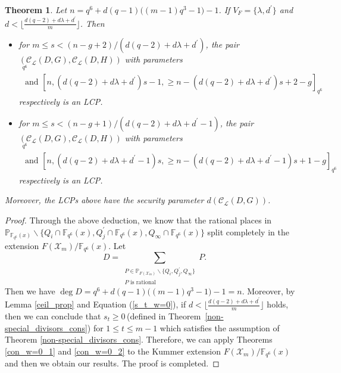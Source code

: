 \documentclass[journal,12pt,onecolumn]{IEEEtran}
\newtheorem{theorem}{Theorem}
\begin{document}
\begin{theorem}
    Let $n = q^6 + d(q-1)\big((m-1)q^3-1\big)-1$. If $V_F = \{\lambda,d^\prime\}$ and $d< \big\lfloor \frac{d(q-2)+d\lambda+d^\prime}{m} \big\rfloor$. Then 
    \begin{itemize}
        \item for $m\le s <(n-g+2)/(d(q-2)+d\lambda+d^\prime)$, the pair $(\mathcal{C}_{\mathcal{L}}(D,G),\mathcal{C}_{\mathcal{L}}(D,H))$ with parameters
        \begin{gather*}
            [n,n-(d(q-2)+d\lambda+d^\prime)s+1,\ge (d(q-2)+d\lambda+d^\prime)s-g]_{q^6}\\
            \text{ and }[n,(d(q-2)+d\lambda+d^\prime)s-1,\ge n-(d(q-2)+d\lambda+d^\prime)s+2-g]_{q^6}
        \end{gather*}
        respectively is an LCP. 
        \item for $m\le s <(n-g+1)/(d(q-2)+d\lambda+d^\prime-1)$, the pair $(\mathcal{C}_{\mathcal{L}}(D,G),\mathcal{C}_{\mathcal{L}}(D,H))$ with parameters
        \begin{gather*}
            [n,n-(d(q-2)+d\lambda+d^\prime-1)s,\ge (d(q-2)+d\lambda+d^\prime-1)s+1-g]_{q^6}\\
            \text{ and }[n,(d(q-2)+d\lambda+d^\prime-1)s,\ge n-(d(q-2)+d\lambda+d^\prime-1)s+1-g]_{q^6}
        \end{gather*}
        respectively is an LCP. 
    \end{itemize}
    Moreover, the LCPs above have the security parameter $d(\mathcal{C}_{\mathcal{L}}(D,G))$. 
\end{theorem}
\begin{proof}
    Through the above deduction, we know that the rational places in $\mathbb{P}_{\mathbb{F}_{q^6}(x)}\backslash\{Q_i\cap\mathbb{F}_{q^6}(x),Q_j^\prime\cap\mathbb{F}_{q^6}(x),Q_\infty\cap\mathbb{F}_{q^6}(x)\}$ split completely in the extension $F(\mathcal{X}_m)/\mathbb{F}_{q^6}(x)$. Let 
    \[
        D = \sum_{\substack{P\in\mathbb{P}_{F(\mathcal{X}_m)}\backslash\{Q_i,Q_j^\prime,Q_\infty\}\\  P \text{ is rational}}}P.
    \]
    Then we have $\deg D = q^6 + d(q-1)\big((m-1)q^3-1\big)-1 = n$. Moreover, by Lemma \ref{ceil_prop} and Equation (\ref{s_t_w=0}), if $d< \big\lfloor \frac{d(q-2)+d\lambda+d^\prime}{m} \big\rfloor$ holds, then we can conclude that $s_t\ge 0$\,(defined in Theorem~\ref{non-special_divisors_cons}) for $1\le t\le m-1$ which satisfies the assumption of Theorem \ref{non-special_divisors_cons}. Therefore, we can apply Theorems \ref{con_w=0_1} and \ref{con_w=0_2} to the Kummer extension $F(\mathcal{X}_m)/\mathbb{F}_{q^6}(x)$ and then we obtain our results. The proof is completed. 
\end{proof}
\end{document}
